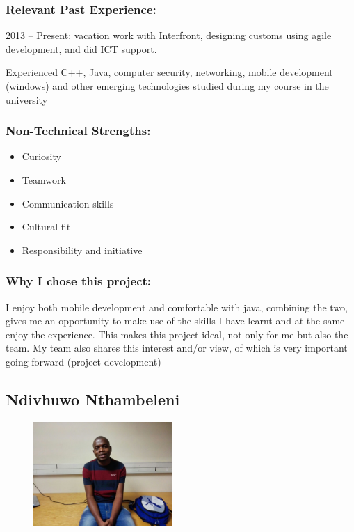 \subsubsection{Relevant Past Experience:}
\par{2013 – Present: vacation work with Interfront, designing customs using agile development, and did ICT support.}
\par{Experienced C++, Java, computer security, networking, mobile development (windows) and other emerging technologies studied during my course in the university}

\subsubsection{Non-Technical Strengths:}
\begin{itemize}
		\item Curiosity
		\item Teamwork
		\item Communication skills
		\item Cultural fit
		\item Responsibility and initiative
	\end{itemize}
\subsubsection{Why I chose this project:}
\par{I enjoy both mobile development and comfortable with java, combining the two, gives me an opportunity to make use of the skills I have learnt and at the same enjoy the experience. This makes this project ideal, not only for me but also the team. My team also shares this interest and/or view, of which is very important going forward (project development)
}

\newpage
\subsection{Ndivhuwo Nthambeleni}
\begin{figure}[h]
			\center
			\includegraphics[width=200px]{images/Ndivhuwo.jpg}
\end{figure}
